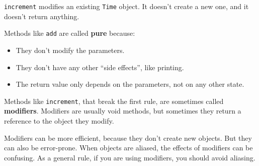 \documentclass[12pt]{book}
\makeatletter
\theoremstyle{exercise}
\newcommand{\java}[1]{\verb"#1"}
\renewcommand{\section}{\@startsection{section}{1}{\z@}%
    {-3.5ex \@plus -1ex \@minus -.2ex}%
    {0.7ex \@plus.2ex}%
    {\normalfont\Large\bfseries}}
\newcommand{\java}[1]{\lstinline{#1}} %
\makeatother
\begin{document}
\java{increment} modifies an existing \java{Time} object.
It doesn't create a new one, and it doesn't return anything.

Methods like \java{add} are called {\bf pure} because:

\begin{itemize}
\item They don't modify the parameters.
\item They don't have any other ``side effects'', like printing.
\item The return value only depends on the parameters, not on any other state.
\end{itemize}

Methods like \java{increment}, that break the first rule, are sometimes called {\bf modifiers}.
Modifiers are usually void methods, but sometimes they return a reference to the object they modify.

Modifiers can be more efficient, because they don't create new objects.
But they can also be error-prone.
When objects are aliased, the effects of modifiers can be confusing.
As a general rule, if you are using modifiers, you should avoid aliasing.








\end{document}
